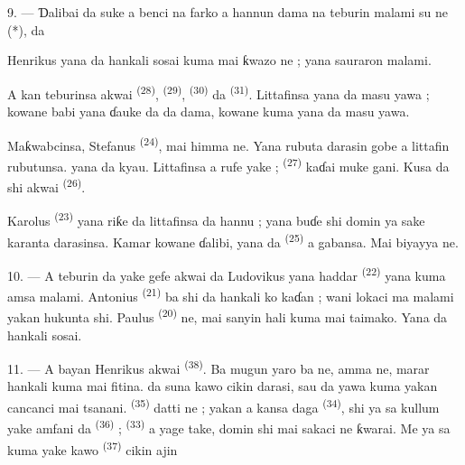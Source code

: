 \VUsaut{3.0mm}

9. --- Ɗalibai da suke a benci na farko a hannun dama na teburin
malami su ne  (*),  da

Henrikus yana da hankali sosai kuma mai ƙwazo ne ; yana sauraron
malami.

A kan teburinsa akwai  \textsuperscript{(28)},
 \textsuperscript{(29)}, 
\textsuperscript{(30)} da 
\textsuperscript{(31)}. Littafinsa yana da  masu yawa
; kowane babi yana ɗauke da  da dama, kowane
 kuma yana da  masu yawa.

Maƙwabcinsa, Stefanus \textsuperscript{(24)}, mai himma ne. Yana
rubuta darasin gobe a littafin rubutunsa.  yana da
kyau. Littafinsa a rufe yake ; 
\textsuperscript{(27)} kaɗai muke gani. Kusa da shi akwai
 \textsuperscript{(26)}.

Karolus \textsuperscript{(23)} yana riƙe da littafinsa da hannu ; yana
buɗe shi domin ya sake karanta darasinsa. Kamar kowane ɗalibi, yana
da  \textsuperscript{(25)} a gabansa. Mai
biyayya ne.

10. --- A teburin da yake gefe akwai 
 da  Ludovikus yana haddar
 \textsuperscript{(22)} yana kuma amsa
 malami. Antonius \textsuperscript{(21)} ba shi da
hankali ko kaɗan ; wani lokaci ma malami yakan hukunta shi. Paulus
\textsuperscript{(20)}  ne, mai sanyin hali kuma
mai taimako. Yana da hankali sosai.

\VUsaut{4.2mm}
\VUsaut{3.2mm}

11. --- A bayan Henrikus akwai 
\textsuperscript{(38)}. Ba mugun yaro ba ne, amma 
ne, marar hankali kuma mai fitina.  da
 suna kawo  cikin darasi,
sau da yawa kuma yakan cancanci  mai tsanani.
 \textsuperscript{(35)} datti ne ;
yakan  a kansa daga 
\textsuperscript{(34)}, shi ya sa kullum yake amfani da  \textsuperscript{(36)} ; 
\textsuperscript{(33)} a yage take, domin shi mai sakaci ne ƙwarai.
Me ya sa kuma yake kawo 
\textsuperscript{(37)} cikin ajin 

